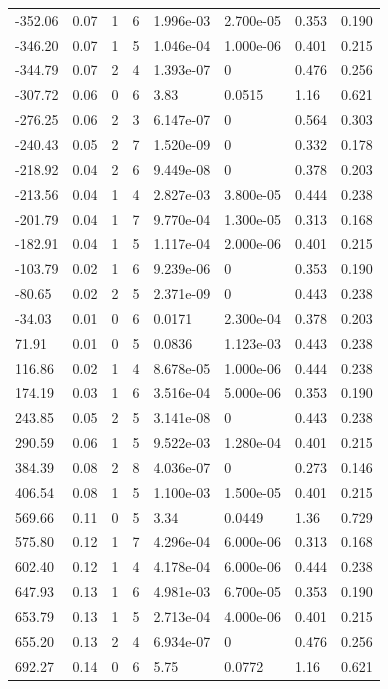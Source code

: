 \documentclass[preview]{standalone}
\begin{document}
{{\begin{tabular}{L{1.2cm}C{1.2cm} C{0.3cm}C{0.5cm} C{1.4cm}C{1.4cm} C{1.4cm}C{1.4cm}}
  -352.06  &  0.07  & 1     &  6 &  1.996e-03  & 2.700e-05  & 0.353 &  0.190   \\ 
  -346.20  &  0.07  & 1     &  5 &  1.046e-04  & 1.000e-06  & 0.401 &  0.215   \\ 
  -344.79  &  0.07  & 2     &  4 &  1.393e-07  & 0  & 0.476 &  0.256   \\ 
  -307.72  &  0.06  & 0     &  6 &  3.83  & 0.0515  & 1.16 &  0.621   \\ 
  -276.25  &  0.06  & 2     &  3 &  6.147e-07  & 0  & 0.564 &  0.303   \\ 
  -240.43  &  0.05  & 2     &  7 &  1.520e-09  & 0  & 0.332 &  0.178   \\ 
  -218.92  &  0.04  & 2     &  6 &  9.449e-08  & 0  & 0.378 &  0.203   \\ 
  -213.56  &  0.04  & 1     &  4 &  2.827e-03  & 3.800e-05  & 0.444 &  0.238   \\ 
  -201.79  &  0.04  & 1     &  7 &  9.770e-04  & 1.300e-05  & 0.313 &  0.168   \\ 
  -182.91  &  0.04  & 1     &  5 &  1.117e-04  & 2.000e-06  & 0.401 &  0.215   \\ 
  -103.79  &  0.02  & 1     &  6 &  9.239e-06  & 0  & 0.353 &  0.190   \\ 
  -80.65  &  0.02  & 2     &  5 &  2.371e-09  & 0  & 0.443 &  0.238   \\ 
  -34.03  &  0.01  & 0     &  6 &  0.0171  & 2.300e-04  & 0.378 &  0.203   \\ 
  71.91  &  0.01  & 0     &  5 &  0.0836  & 1.123e-03  & 0.443 &  0.238   \\ 
  116.86  &  0.02  & 1     &  4 &  8.678e-05  & 1.000e-06  & 0.444 &  0.238   \\ 
  174.19  &  0.03  & 1     &  6 &  3.516e-04  & 5.000e-06  & 0.353 &  0.190   \\ 
  243.85  &  0.05  & 2     &  5 &  3.141e-08  & 0  & 0.443 &  0.238   \\ 
  290.59  &  0.06  & 1     &  5 &  9.522e-03  & 1.280e-04  & 0.401 &  0.215   \\ 
  384.39  &  0.08  & 2     &  8 &  4.036e-07  & 0  & 0.273 &  0.146   \\ 
  406.54  &  0.08  & 1     &  5 &  1.100e-03  & 1.500e-05  & 0.401 &  0.215   \\ 
  569.66  &  0.11  & 0     &  5 &  3.34  & 0.0449  & 1.36 &  0.729   \\ 
  575.80  &  0.12  & 1     &  7 &  4.296e-04  & 6.000e-06  & 0.313 &  0.168   \\ 
  602.40  &  0.12  & 1     &  4 &  4.178e-04  & 6.000e-06  & 0.444 &  0.238   \\ 
  647.93  &  0.13  & 1     &  6 &  4.981e-03  & 6.700e-05  & 0.353 &  0.190   \\ 
  653.79  &  0.13  & 1     &  5 &  2.713e-04  & 4.000e-06  & 0.401 &  0.215   \\ 
  655.20  &  0.13  & 2     &  4 &  6.934e-07  & 0  & 0.476 &  0.256   \\ 
  692.27  &  0.14  & 0     &  6 &  5.75  & 0.0772  & 1.16 &  0.621   \\ 
\hline 
\end{tabular} 

}}
\end{document}
